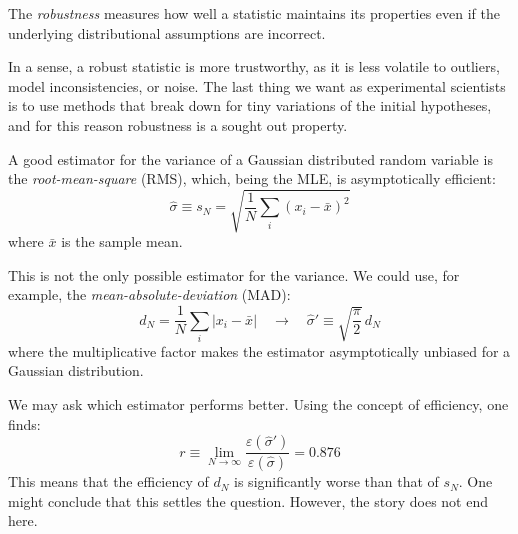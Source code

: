 \begin{definition}
	The \emph{robustness} measures how well a statistic maintains its properties even if the underlying distributional assumptions are incorrect. 
\end{definition}

In a sense, a robust statistic is more trustworthy, as it is less volatile to outliers, model inconsistencies, or noise. The last thing we want as experimental scientists is to use methods that break down for tiny variations of the initial hypotheses, and for this reason robustness is a sought out property.

\begin{example}
	A good estimator for the variance of a Gaussian distributed random variable is the \emph{root-mean-square} (RMS), which, being the MLE, is asymptotically efficient:
	\[
	\hat\sigma \equiv s_N = \sqrt{\frac{1}{N}\sum_i (x_i - \bar{x})^2}
	\]
	where $\bar{x}$ is the sample mean.
	
	This is not the only possible estimator for the variance. We could use, for example, the \emph{mean-absolute-deviation} (MAD):
	\[
	d_N = \frac{1}{N}\sum_i |x_i - \bar{x}| \quad \rightarrow \quad \hat\sigma' \equiv \sqrt{\frac{\pi}{2}}\, d_N
	\]
	where the multiplicative factor makes the estimator asymptotically unbiased for a Gaussian distribution.
	
	We may ask which estimator performs better. Using the concept of efficiency, one finds:
	\[
	r \equiv \lim_{N \to \infty} \frac{\varepsilon(\hat\sigma')}{\varepsilon(\hat\sigma)} = 0.876
	\]
	This means that the efficiency of $d_N$ is significantly worse than that of $s_N$. One might conclude that this settles the question. However, the story does not end here.
	

\end{example}
